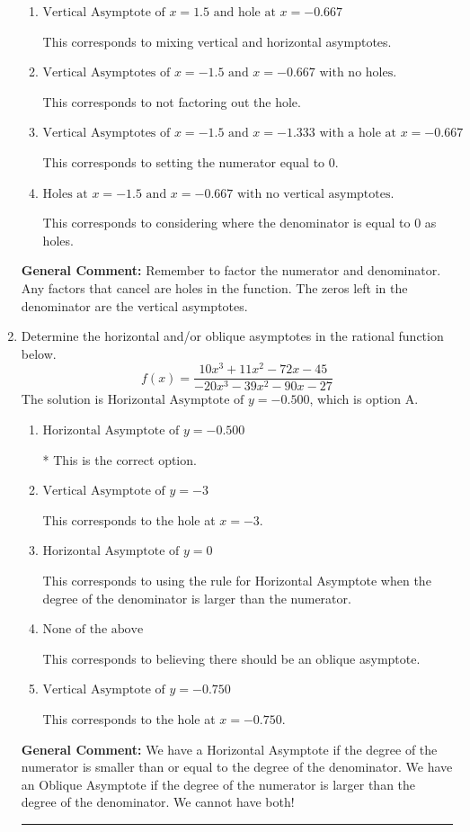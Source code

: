 \documentclass{extbook}[14pt]
\newcommand{\litem}[1]{\item #1

\rule{\textwidth}{0.4pt}}
\begin{document}
\begin{enumerate}
{\begin{enumerate}[label=\Alph*.]
This is the correct answer.
\item \( \text{Vertical Asymptote of } x = 1.5 \text{ and hole at } x = -0.667 \)

This corresponds to mixing vertical and horizontal asymptotes.
\item \( \text{Vertical Asymptotes of } x = -1.5 \text{ and } x = -0.667 \text{ with no holes.} \)

This corresponds to not factoring out the hole.
\item \( \text{Vertical Asymptotes of } x = -1.5 \text{ and } x = -1.333 \text{ with a hole at } x = -0.667 \)

This corresponds to setting the numerator equal to 0.
\item \( \text{Holes at } x = -1.5 \text{ and } x = -0.667 \text{ with no vertical asymptotes.} \)

This corresponds to considering where the denominator is equal to 0 as holes.
\end{enumerate}

\textbf{General Comment:} Remember to factor the numerator and denominator. Any factors that cancel are holes in the function. The zeros left in the denominator are the vertical asymptotes.
}
\litem{
Determine the horizontal and/or oblique asymptotes in the rational function below.
\[ f(x) = \frac{10x^{3} +11 x^{2} -72 x -45}{-20x^{3} -39 x^{2} -90 x -27} \]The solution is \( \text{Horizontal Asymptote of } y = -0.500  \), which is option A.\begin{enumerate}[label=\Alph*.]
\item \( \text{Horizontal Asymptote of } y = -0.500  \)

* This is the correct option.
\item \( \text{Vertical Asymptote of } y = -3  \)

This corresponds to the hole at $x = -3$.
\item \( \text{Horizontal Asymptote of } y = 0  \)

This corresponds to using the rule for Horizontal Asymptote when the degree of the denominator is larger than the numerator.
\item \( \text{None of the above} \)

This corresponds to believing there should be an oblique asymptote.
\item \( \text{Vertical Asymptote of } y = -0.750  \)

This corresponds to the hole at $x = -0.750$.
\end{enumerate}

\textbf{General Comment:} We have a Horizontal Asymptote if the degree of the numerator is smaller than or equal to the degree of the denominator. We have an Oblique Asymptote if the degree of the numerator is larger than the degree of the denominator. We cannot have both!
}
\end{enumerate}
\end{document}
